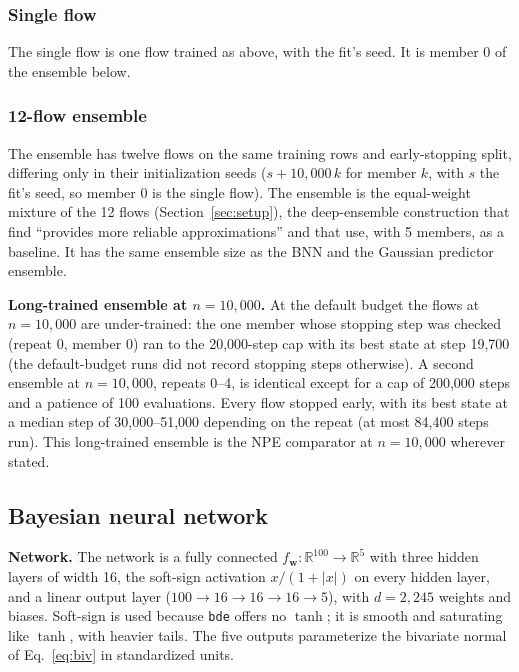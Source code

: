 \documentclass[11pt]{article}
\newcommand{\code}[1]{\texttt{#1}}
\begin{document}
\subsubsection{Single flow}
\label{sec:npe_single}
The single flow is one flow trained as above, with the fit's seed. It is member 0 of the ensemble below.

\subsubsection{12-flow ensemble}
\label{sec:npe_ens}
The ensemble has twelve flows on the same training rows and early-stopping split, differing only in their initialization seeds
($s+10{,}000\,k$ for member $k$, with $s$ the fit's seed, so member 0 is the single flow). The ensemble is the
equal-weight mixture of the 12 flows (Section~\ref{sec:setup}), the deep-ensemble construction that
\citet{hermans2022trust} find ``provides more reliable approximations'' and that \citet{delaunoy2024lowbudget} use, with
5 members, as a baseline. It has the same ensemble size as the BNN and the Gaussian predictor ensemble.

\textbf{Long-trained ensemble at $n=10{,}000$.} At the default budget the flows at $n=10{,}000$ are under-trained: the
one member whose stopping step was checked (repeat 0, member 0) ran to the 20{,}000-step cap with its best state at
step 19{,}700 (the default-budget runs did not record stopping steps otherwise). A second ensemble at $n=10{,}000$,
repeats 0--4, is identical except for a cap of 200{,}000 steps and a patience of 100 evaluations. Every flow stopped
early, with its best state at a median step of 30{,}000--51{,}000 depending on the repeat (at most 84{,}400 steps
run). This long-trained ensemble is the NPE comparator at $n=10{,}000$ wherever stated.

\subsection{Bayesian neural network}
\label{sec:bnn}
\textbf{Network.} The network is a fully connected $f_{\mathbf w}:\mathbb{R}^{100}\to\mathbb{R}^5$ with three hidden
layers of width 16, the soft-sign activation $x/(1+|x|)$ on every hidden layer, and a linear output layer
($100\to16\to16\to16\to5$), with $d=2{,}245$ weights and biases. Soft-sign is used because \code{bde} offers no
$\tanh$; it is smooth and saturating like $\tanh$, with heavier tails. The five outputs parameterize the
bivariate normal of Eq.~\eqref{eq:biv} in standardized units.
\end{document}
